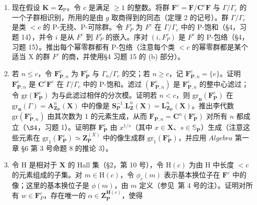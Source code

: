 \begin{enumerate}
\def\labelenumi{(\alph{enumi})}
\setcounter{enumi}{1}
\item
  现在假设 \(\mathbf{K} = \mathbf{Z}_{\mathrm{P}}\)。令 \(c\) 是满足 \(\geqslant 1\) 的整数。将群 \(\mathbf{F}^c = \mathbf{F} / \mathbf{C}^c\mathbf{F}\) 与 \(\Gamma /\Gamma_c\) 的一个子群相识别，所用的是由 \(g\) 取商得到的同态（定理 2 的记号）。群 \(\Gamma / \Gamma_c\) 是类 \(< c\) 的 P-无挠、P-可除群。令 \(F_P^c\) 为 \(F^c\) 在 \(\Gamma / \Gamma_c\) 中的 P-饱和（§4，习题 14），并令 \(i\) 是从 \(F^c\) 到 \(F_P^c\) 的嵌入。序对 \((i, F_P^c)\) 是 \(F^c\) 的 P-包络（§4，习题 15）。推出每个幂零群都有 P-包络（注意每个类 \(< c\) 的幂零群都是某个适当 X 的群 \(F^c\) 的商，并使用§4 习题 15 的 (b) 部分）。
\item
  若 \(n \leqslant c\)，令 \(\mathbf{F}_{\mathbf{P},n}^{\mathrm{c}}\) 为 \(\mathbf{F}_{\mathbf{P}}^{\mathrm{c}}\) 与 \(\Gamma_{n}/\Gamma_{c}\) 的交；若 \(n \geqslant c\)，记 \(\mathbf{F}_{\mathbf{P},n}^{\mathrm{c}} = \{e\}\)。证明 \(\mathbf{F}_{\mathbf{P},n}^{\mathrm{c}}\) 是 \(\mathbf{C}^{\mathrm{c}}\mathbf{F}^{\mathrm{c}}\) 在 \(\Gamma/\Gamma_{c}\) 中的 P-饱和。滤过 \((\mathbf{F}_{\mathbf{P},n}^{\mathrm{c}})\) 是 \(\mathbf{F}_{\mathbf{P},n}^{\mathrm{c}}\) 的整中心滤过；令 \(\text{gr}(\mathbf{F}_{\mathbf{P}}^{\mathrm{c}})\) 为与此滤过相伴的分次模。证明若 \(n < c\)，则 \(\text{gr}_{\mathbf{n}}(\mathbf{F}_{\mathbf{P}}^{\mathrm{c}})\) 在 \(\text{gr}_{\mathbf{n}}(\Gamma) = \mathbf{A}_{\mathbf{Z}_{\mathbf{P}}}^{n}(\mathbf{X})\) 中的像是 \(\mathbf{S}_{\mathbf{P}}^{-1}. \mathbf{L}_{\mathbf{Z}}^{n}(\mathbf{X}) = \mathbf{L}_{\mathbf{Z}_{\mathbf{P}}}^{n}(\mathbf{X})\)。推出李代数 \(\text{gr}(\mathbf{F}_{\mathbf{P},n}^{\mathrm{c}})\) 由其次数为 1 的元素生成，从而 \(\mathbf{F}_{\mathbf{P},n} = \mathbf{C}^{n}(\mathbf{F}_{\mathbf{P}}^{\mathrm{c}})\) 对所有 \(n\) 都成立（\(\S 4\)，习题 1）。证明群 \(\mathbf{F}_{\mathbf{P}}^{\mathrm{c}}\) 由 \(x^{1/s}\)（其中 \(x \in \mathbf{X}\)、\(s \in \mathbb{S}_{\mathbf{P}}\)）生成（注意这些元素在 \(\text{gr}_1(\mathbf{F}_{\mathbf{P}}^{\mathrm{c}}) \simeq \mathbf{Z}_{\mathbf{P}}^{(X)}\) 中的像生成群 \(\text{gr}_1(\mathbf{F}_{\mathbf{P}}^{\mathrm{c}})\)，并应用 \(Algebra\) 第一章 §6 第 3 号命题 8 的推论 3）。
\item
  令 \(\mathrm{H}\) 是相对于 \(\mathbf{X}\) 的 Hall 集（§2，第 10 号），令 \(\mathrm{H}(c)\) 为由 \(\mathrm{H}\) 中长度 \(< c\) 的元素组成的子集。对 \(m \in \mathrm{H}(c)\)，令 \(\phi_c(m)\) 表示基本换位子在 \(\mathbf{F}^c\) 中的像；这里的基本换位子是 \(\phi(m)\)，由 \(m\) 定义（参见~第 4 号的注）。证明对所有 \(w \in \mathbf{F}_P^c\)，存在唯一的 \(\alpha \in \mathbf{Z}_{\mathbf{P}}^{\mathbf{H}(c)}\)，使得
\end{enumerate}

